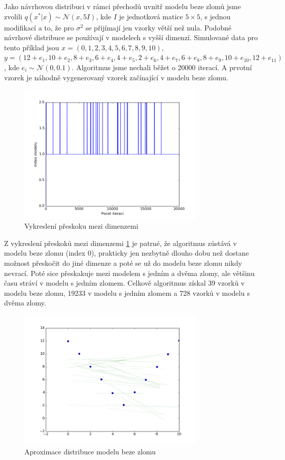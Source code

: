 \documentclass[czech,master,public,dept470,male,cpdeclaration,oneside, python]{diploma}
\begin{document}
Jako návrhovou distribuci v rámci přechodů uvnitř modelu beze zlomů jsme zvolili $q(x^* | x) \sim \mathcal{N}(x, 5I)$, kde $I$ je jednotková matice $5\times5$, s jednou modifikací a to, že pro $\sigma^2$ se přijímají jen vzorky větší než nula. Podobné návrhové distribuce se používají v modelech s vyšší dimenzí. Simulované data pro tento příklad jsou $x = (0, 1, 2, 3, 4, 5, 6, 7, 8, 9, 10)$, $y = (12 + e_1, 10 + e_2, 8 + e_3, 6 + e_4, 4 + e_5, 2 + e_6, 4 + e_7, 6 + e_8, 8 + e_9, 10 + e_10, 12 + e_11)$, kde $e_i \sim \mathcal{N}(0, 0.1)$. Algoritmus jsme nechali běžet o 20000 iterací. A prvotní vzorek je náhodně vygenerovaný vzorek začínající v modelu beze zlomu. 
\begin{figure}
	[H]\centering\includegraphics[width=0.8\textwidth]{images/ks_example_V.png}\caption{Vykreslení přeskoku mezi dimenzemi}\label{priklad1_prechody}
\end{figure} \par
Z vykreslení přeskoků mezi dimenzemi \ref{priklad1_prechody} je patrné, že algoritmus zůstává v modelu beze zlomu (index 0), prakticky jen nezbytně dlouho dobu než dostane možnost přeskočit do jiné dimenze a poté se už do modelu beze zlomu nikdy nevrací. Poté sice přeskakuje mezi modelem s jedním a dvěma zlomy, ale většinu času stráví v modelu s jedním zlomem. Celkově algoritmus získal 39 vzorků v modelu beze zlomu, 19233 v modelu s jedním zlomem a 728 vzorků v modelu s dvěma zlomy.
\begin{figure}
	[h]\centering\includegraphics[width=0.8\textwidth]{images/distribution_lines_v_0breaks.png}\caption{Aproximace distribuce modelu beze zlomu}\label{v0break}
\end{figure}
\end{document}
